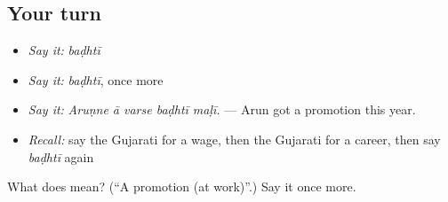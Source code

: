 \subsection*{Your turn}
\begin{itemize}
\raggedright
  \item \emph{Say it:} \emph{baḍhtī}
  \item \emph{Say it:} \emph{baḍhtī}, once more
  \item \emph{Say it:} \emph{Aruṇne ā varse baḍhtī maḷī.} — Arun got a promotion this year.
  \item \emph{Recall:} say the Gujarati for a wage, then the Gujarati for a career, then say \emph{baḍhtī} again
\end{itemize}

\begin{tcolorbox}[breakable,colback=teal!4,colframe=teal!35!black,title={Before you move on}]
What does  mean? (\textquotedblleft{}A promotion (at work)\textquotedblright{}.) Say it once more.
\end{tcolorbox}
